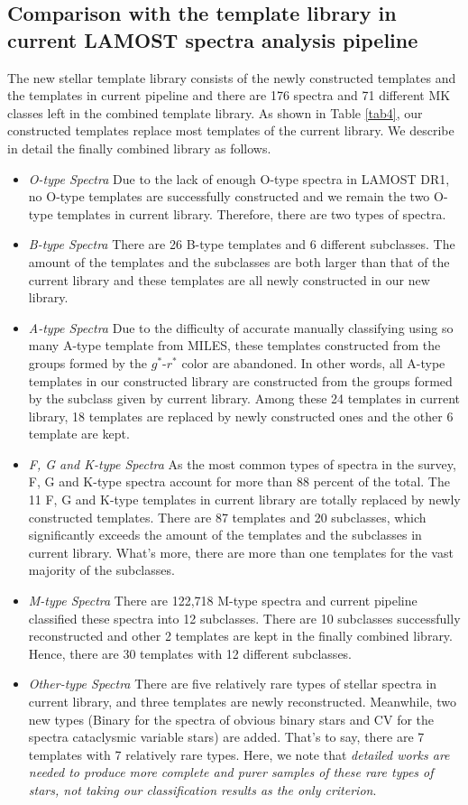 \documentclass[manuscript]{aastex}
\begin{document}
\subsection{Comparison with the  template library in current LAMOST spectra analysis pipeline}
The new stellar template library consists of the  newly constructed templates and the templates in current pipeline and there are 176 spectra and 71 different MK classes  left in the combined template library.
As shown in Table \ref{tab4},
our constructed templates replace most templates of the  current library.
We describe in detail the finally combined library as follows.
\begin{itemize}
\item \emph{O-type Spectra} Due to the lack of enough O-type spectra in LAMOST DR1,
no O-type templates are successfully constructed and we remain the two O-type templates in current library.
Therefore, there are two types of spectra.
\item \emph{B-type Spectra} There are 26 B-type templates and 6 different subclasses.
The amount of the templates and the subclasses are both larger than that of the current library and these templates are all newly constructed in our  new library.
\item \emph{A-type Spectra} Due to the difficulty of accurate manually classifying using so many A-type template from MILES,
these templates constructed from the groups formed by the $g^*$-$r^*$ color are abandoned.
In other words, all A-type templates in our constructed library are constructed from the groups formed by the subclass given by current library.
Among these 24 templates in current library,
18 templates are replaced by newly constructed ones and the other 6 template are kept.
\item \emph{F, G and K-type Spectra} As the most common types of spectra in the survey,
F, G and K-type spectra account for more than 88 percent of the total.
The 11 F, G and K-type templates in current library are totally replaced by newly constructed templates.
There are 87 templates and 20 subclasses,
which significantly exceeds the amount of the templates and the subclasses in current library.
What's more,
there are more than one templates for the vast majority of the subclasses.
\item \emph{M-type Spectra}
There are 122,718 M-type spectra and current pipeline classified these spectra into 12 subclasses.
There are 10 subclasses successfully reconstructed and  other 2 templates are kept in the finally combined library.
Hence, there are 30 templates with 12 different subclasses.
\item \emph{Other-type Spectra}
There are five relatively rare types of stellar spectra in current library,
and three templates are newly reconstructed.
Meanwhile, two new types (Binary for the spectra of obvious binary stars and CV for the spectra cataclysmic variable stars) are added.
That's to say,
there are 7 templates with 7 relatively rare types.
Here, we note that \emph{detailed works are needed to produce more complete and purer  samples of these rare types of stars,
not taking our classification results as the only criterion}.
\end{itemize}
\end{document}

